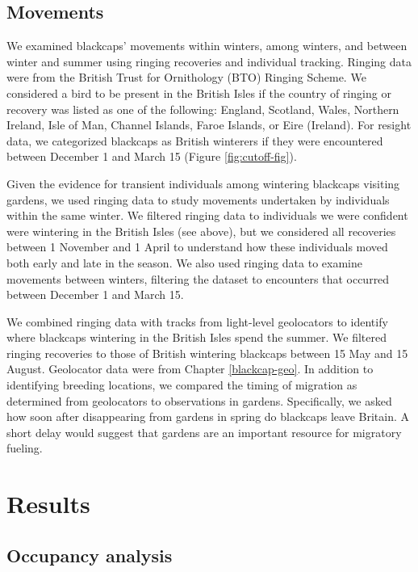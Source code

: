 \documentclass[a4paper, nobind]{templates/ociamthesis}
\begin{document}
\hypertarget{movements}{%
\subsection{Movements}\label{movements}}

We examined blackcaps' movements within winters, among winters, and between winter and summer using ringing recoveries and individual tracking. Ringing data were from the British Trust for Ornithology (BTO) Ringing Scheme. We considered a bird to be present in the British Isles if the country of ringing or recovery was listed as one of the following: England, Scotland, Wales, Northern Ireland, Isle of Man, Channel Islands, Faroe Islands, or Eire (Ireland). For resight data, we categorized blackcaps as British winterers if they were encountered between December 1 and March 15 (Figure \ref{fig:cutoff-fig}).

Given the evidence for transient individuals among wintering blackcaps visiting gardens, we used ringing data to study movements undertaken by individuals within the same winter. We filtered ringing data to individuals we were confident were wintering in the British Isles (see above), but we considered all recoveries between 1 November and 1 April to understand how these individuals moved both early and late in the season. We also used ringing data to examine movements between winters, filtering the dataset to encounters that occurred between December 1 and March 15.

We combined ringing data with tracks from light-level geolocators to identify where blackcaps wintering in the British Isles spend the summer. We filtered ringing recoveries to those of British wintering blackcaps between 15 May and 15 August. Geolocator data were from Chapter \ref{blackcap-geo}. In addition to identifying breeding locations, we compared the timing of migration as determined from geolocators to observations in gardens. Specifically, we asked how soon after disappearing from gardens in spring do blackcaps leave Britain. A short delay would suggest that gardens are an important resource for migratory fueling.

\hypertarget{results}{%
\section{Results}\label{results}}

\hypertarget{occupancy-analysis-1}{%
\subsection{Occupancy analysis}\label{occupancy-analysis-1}}
\end{document}
